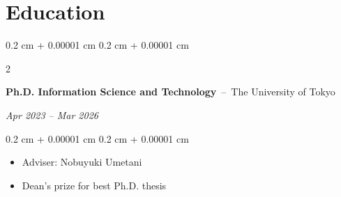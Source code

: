 \documentclass[10pt, letterpaper]{article}
\newenvironment{highlights}{
    \begin{itemize}[
        topsep=0.10 cm,
        parsep=0.10 cm,
        partopsep=0pt,
        itemsep=0pt,
        leftmargin=0.4 cm + 10pt
    ]
}{
    \end{itemize}
} %
\newenvironment{highlightsforbulletentries}{
    \begin{itemize}[
        topsep=0.10 cm,
        parsep=0.10 cm,
        partopsep=0pt,
        itemsep=0pt,
        leftmargin=10pt
    ]
}{
    \end{itemize}
} %
\newenvironment{onecolentry}{
    \begin{adjustwidth}{
        0.2 cm + 0.00001 cm
    }{
        0.2 cm + 0.00001 cm
    }
}{
    \end{adjustwidth}
} %
\newenvironment{twocolentry}[2][]{
    \onecolentry
    \def\secondColumn{#2}
    \setcolumnwidth{\fill, 4.5 cm}
    \begin{paracol}{2}
}{
    \switchcolumn \raggedleft \secondColumn
    \end{paracol}
    \endonecolentry
} %
\let\hrefWithoutArrow\href
\renewcommand{\href}[2]{\hrefWithoutArrow{#1}{\ifthenelse{\equal{#2}{}}{ }{#2 }\raisebox{.15ex}{\footnotesize \faExternalLink*}}}
\begin{document}









    \section{Education}

        \begin{twocolentry}{
        \textit{Apr 2023 – Mar 2026}}
            \textbf{Ph.D. Information Science and Technology}
            \,--\, The University of Tokyo
        \end{twocolentry}
        \vspace{0.10 cm}
        \begin{onecolentry}
            \begin{highlights}
                \item Adviser: Nobuyuki Umetani
                \item Dean's prize for best Ph.D. thesis
            \end{highlights}
        \end{onecolentry}
\end{document}

